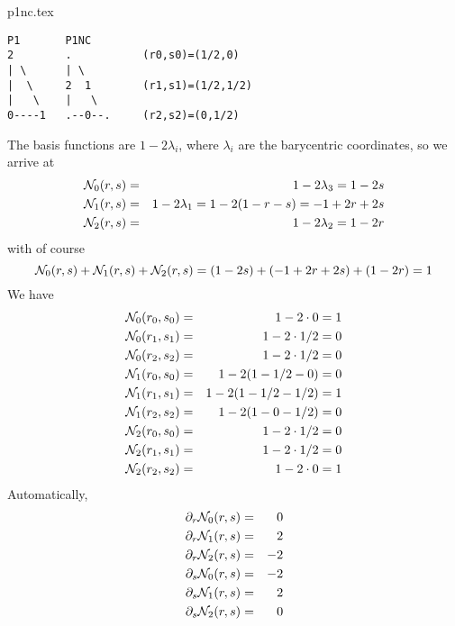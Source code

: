 \begin{flushright} {\tiny {\color{gray} p1nc.tex}} \end{flushright}

\begin{verbatim}
P1       P1NC
2        .           (r0,s0)=(1/2,0)
| \      | \         
|  \     2  1        (r1,s1)=(1/2,1/2)
|   \    |   \
0----1   .--0--.     (r2,s2)=(0,1/2)
\end{verbatim}

The basis functions are $1-2\lambda_i$, where $\lambda_i$ are the barycentric coordinates, so we arrive at
\begin{eqnarray}
{\mathcal{N}}_0(r,s)&=& 1- 2\lambda_3 = 1-2s \nonumber\\ 
{\mathcal{N}}_1(r,s)&=& 1- 2\lambda_1 = 1-2(1-r-s) = -1+2r+2s\nonumber\\ 
{\mathcal{N}}_2(r,s)&=& 1- 2\lambda_2 =1-2r \nonumber
\end{eqnarray}
with of course
\[
{\mathcal{N}}_0(r,s)+{\mathcal{N}}_1(r,s)+{\mathcal{N}}_2(r,s) =  (1-2s) + (-1+2r+2s) + (1-2r) = 1
\]
We have
\begin{eqnarray}
{\mathcal{N}}_0(r_0,s_0)&=&  1-2\cdot 0 =1 \nonumber\\
{\mathcal{N}}_0(r_1,s_1)&=&  1-2\cdot 1/2 =0\nonumber\\
{\mathcal{N}}_0(r_2,s_2)&=&  1-2\cdot 1/2 =0\nonumber\\
{\mathcal{N}}_1(r_0,s_0)&=&  1-2(1-1/2-0)= 0 \nonumber\\
{\mathcal{N}}_1(r_1,s_1)&=&  1-2(1-1/2-1/2)= 1 \nonumber\\
{\mathcal{N}}_1(r_2,s_2)&=&  1-2(1-0-1/2)= 0 \nonumber\\
{\mathcal{N}}_2(r_0,s_0)&=&  1-2\cdot 1/2 =0\nonumber\\
{\mathcal{N}}_2(r_1,s_1)&=&  1-2\cdot 1/2 =0\nonumber\\
{\mathcal{N}}_2(r_2,s_2)&=&  1-2\cdot 0 =1 \nonumber
\end{eqnarray}
Automatically,
\begin{eqnarray}
\partial_r {\mathcal{N}}_0(r,s)&=& 0 \nonumber \\ 
\partial_r {\mathcal{N}}_1(r,s)&=& 2 \nonumber\\
\partial_r {\mathcal{N}}_2(r,s)&=& -2 \nonumber\\
\partial_s {\mathcal{N}}_0(r,s)&=& -2 \nonumber\\ 
\partial_s {\mathcal{N}}_1(r,s)&=& 2 \nonumber\\
\partial_s {\mathcal{N}}_2(r,s)&=& 0 \nonumber
\end{eqnarray}

